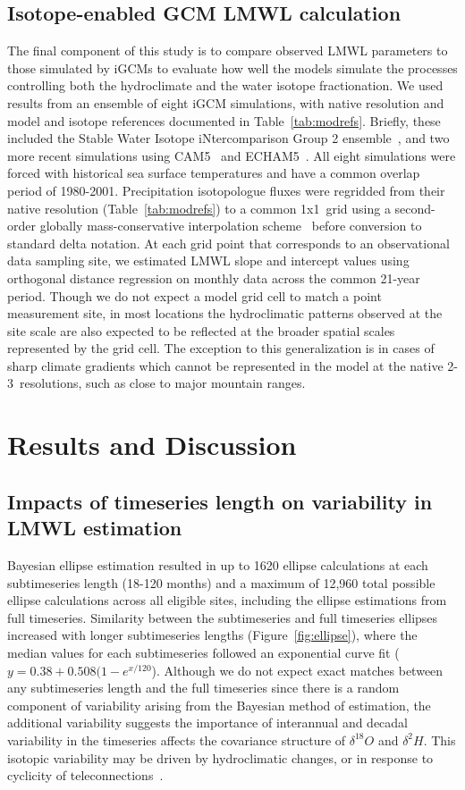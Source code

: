 \documentclass[draft, linenumbers]{agujournal2018}
\begin{document}
\subsection{Isotope-enabled GCM LMWL calculation}
The final component of this study is to compare observed LMWL parameters to those simulated by iGCMs to evaluate how well the models simulate the processes controlling both the hydroclimate and the water isotope fractionation. We used results from an ensemble of eight iGCM simulations, with native resolution and model and isotope references documented in Table~\ref{tab:modrefs}. Briefly, these included the Stable Water Isotope iNtercomparison Group 2 ensemble~\citep{Risi2012}, and two more recent simulations using CAM5~\citep{Nusbaumer2017} and ECHAM5~\citep{Steiger2017}. All eight simulations were forced with historical sea surface temperatures and have a common overlap period of 1980-2001. Precipitation isotopologue fluxes were regridded from their native resolution (Table~\ref{tab:modrefs}) to a common 1\textdegree x1\textdegree\ grid using a second-order globally mass-conservative interpolation scheme~\citep{Jones1999} before conversion to standard delta notation. At each grid point that corresponds to an observational data sampling site, we estimated LMWL slope and intercept values using orthogonal distance regression on monthly data across the common 21-year period. Though we do not expect a model grid cell to match a point measurement site, in most locations the hydroclimatic patterns observed at the site scale are also expected to be reflected at the broader spatial scales represented by the grid cell. The exception to this generalization is in cases of sharp climate gradients which cannot be represented in the model at the native 2-3\textdegree\ resolutions, such as close to major mountain ranges.  

\section{Results and Discussion}
\subsection{Impacts of timeseries length on variability in LMWL estimation}
Bayesian ellipse estimation resulted in up to 1620 ellipse calculations at each subtimeseries length (18-120 months) and a maximum of 12,960 total possible ellipse calculations across all eligible sites, including the ellipse estimations from full timeseries. Similarity between the subtimeseries and full timeseries ellipses increased with longer subtimeseries lengths (Figure~\ref{fig:ellipse}), where the median values for each subtimeseries followed an exponential curve fit ($y =0.38+ 0.508 (1-e^{x/120}$). Although we do not expect exact matches between any subtimeseries length and the full timeseries since there is a random component of variability arising from the Bayesian method of estimation, the additional variability suggests the importance of interannual and decadal variability in the timeseries affects the covariance structure of $\delta^{18}O$ and $\delta^{2}H$. This isotopic variability may be driven by hydroclimatic changes, or in response to cyclicity of teleconnections~\citep{Baldini2008, Liu2011}. 
\end{document}
